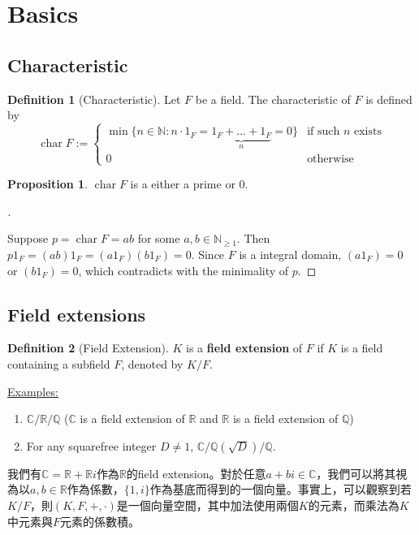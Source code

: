 \documentclass{article}
\theoremstyle{definition}
\newcommand{\ex}{\noindent\underline{Examples:}}
\newtheorem{dfn}{Definition}
\newtheorem{prop}{Proposition}
\newenvironment{proofs}[1][\proofname]{%
  \begin{proof}[#1]$ $\par\nobreak\ignorespaces
}{%
  \end{proof}
}
\newcommand{\CC}{\mathbb C}
\newcommand{\NN}{\mathbb N}
\newcommand{\QQ}{\mathbb Q}
\newcommand{\RR}{\mathbb R}
\DeclareMathOperator{\Char}{char}
\begin{document}
\section{Basics}

\subsection{Characteristic}

\begin{dfn}[Characteristic]
	Let $F$ be a field. The characteristic of $F$ is defined by
	$$\Char F := \begin{cases*} \min\{n\in\NN : n\cdot 1_F=\underbrace{1_F+\dots+ 1_F}_n = 0\} & \text{if such $n$ exists}\\ 0 & \text{otherwise}\end{cases*}$$
\end{dfn}

\begin{prop} $\Char F$ is a either a prime or $0$.
\end{prop}

\begin{proofs}
	Suppose $p=\Char F=ab$ for some $a,b\in \NN_{\ge 1}$. Then $p1_F=(ab)1_F=(a1_F)(b1_F)=0$. Since $F$ is a integral domain, $(a1_F)=0$ or $(b1_F)=0$, which contradicts with the minimality of $p$.
\end{proofs}

\subsection{Field extensions}

\begin{dfn}[Field Extension]
	$K$ is a \textbf{field extension} of $F$ if $K$ is a field containing a subfield $F$, denoted by $K/F$.
\end{dfn}

\ex

\begin{enumerate}
	\item $\CC/\RR/\QQ$ ($\CC$ is a field extension of $\RR$ and $\RR$ is a field extension of $\QQ$)
	\item For any squarefree integer $D\neq 1$, $\CC / \QQ(\sqrt{D}) / \QQ$.
\end{enumerate}

我們有$\CC=\RR+\RR i$作為$\RR$的field extension。對於任意$a+bi\in\CC$，我們可以將其視為以$a,b\in \RR$作為係數，$\{1,i\}$作為基底而得到的一個向量。事實上，可以觀察到若$K/F$，則$(K,F,+,\cdot)$是一個向量空間，其中加法使用兩個$K$的元素，而乘法為$K$中元素與$F$元素的係數積。
\end{document}

